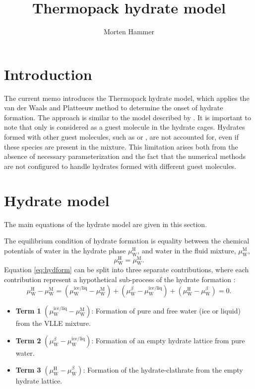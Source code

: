 \documentclass[english]{../thermomemo/thermomemo}
\title{Thermopack hydrate model}
\author{Morten Hammer}
\newcommand{\liq}{\text{liq}}
\newcommand{\hyd}{\text{H}}
\newcommand{\wat}{\text{W}}
\newcommand{\mix}{\text{M}}
\newcommand{\ice}{\text{ice}}
\newcommand{\free}{{\ice/\liq}}
\begin{document}
\frontmatter

\section{Introduction}
The current memo introduces the Thermopack hydrate model, which
applies the van der Waals and Platteeuw method to determine the onset
of hydrate formation. The approach is similar to the model described
by \citet{Chapoy2012}. It is important to note that only  is
considered as a guest molecule in the hydrate cages. Hydrates formed
with other guest molecules, such as  or , are not
accounted for, even if these species are present in the mixture. This
limitation arises both from the absence of necessary parameterization
and the fact that the numerical methods are not configured to handle
hydrates formed with different guest molecules.

\section{Hydrate model}
The main equations of the hydrate model are given in this section.

The equilibrium condition of hydrate formation is equality between the
chemical potentials of water in the hydrate phase $\mu_\wat^\hyd$, and
water in the fluid mixture,
$\mu_\wat^\mix$,
\begin{equation}
\label{eq:hydform}
\mu_\wat^\hyd = \mu_\wat^\mix.
\end{equation}
Equation \eqref{eq:hydform} can be split into three separate
contributions, where each contribution represent a hypothetical
sub-process of the hydrate formation \citet{Sloan2008}:
\begin{equation}
\label{eq:hydsplit}
\mu_\wat^\hyd - \mu_\wat^\mix = \left( \mu_\wat^\free - \mu_\wat^\mix
\right) + \left( \mu_\wat^\beta - \mu_\wat^\free \right) + \left(
  \mu_\wat^\hyd - \mu_\wat^\beta \right) = 0.
\end{equation}

\begin{itemize}
\item \textbf{Term 1} $\left(\mu_\wat^\free - \mu_\wat^\mix\right)$: Formation of pure and free water (ice
  or liquid) from the VLLE mixture.
\item \textbf{Term 2} $\left(\mu_\wat^\beta - \mu_\wat^\free\right)$: Formation of an empty hydrate
  lattice from pure water.
\item \textbf{Term 3} $\left(\mu_\wat^\hyd - \mu_\wat^\beta\right)$: Formation of the
  hydrate-clathrate from the empty hydrate lattice.
\end{itemize}
\end{document}
